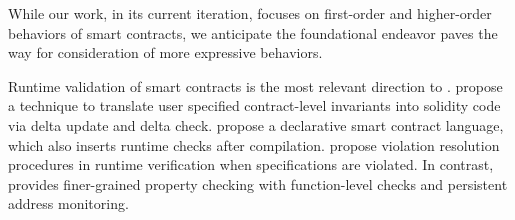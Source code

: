 While our work, in its current iteration, focuses on first-order and higher-order behaviors of smart contracts, we anticipate the foundational endeavor paves the way for consideration of more expressive behaviors.
\fi




Runtime validation of smart contracts is the most relevant direction to \lang.
\citet{DBLP:conf/pldi/LiCL20} propose a technique to translate user specified 
contract-level invariants into solidity code via delta update and delta check.
\citet{chen2022declarative} propose a declarative smart contract language, 
which also inserts runtime checks after compilation.
\citet{DBLP:conf/edcc/EllulP18} propose violation resolution procedures in runtime verification when specifications are violated.
In contrast, \lang provides finer-grained property checking with function-level checks and persistent address monitoring.

